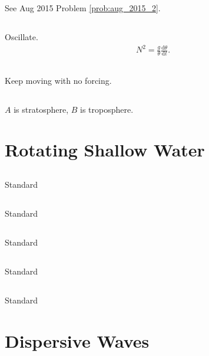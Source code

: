 \documentclass[11pt,letterpaper]{book}
\theoremstyle{definition}
\newcommand{\de}{\mathrm{d}}
\begin{document}
\subsection{}
See Aug 2015 Problem \ref{prob:aug_2015_2}.

\subsection{}
Oscillate. 
\begin{align*}
    N^2 = \frac{g}{\theta}\frac{\de \theta}{\de t}.
\end{align*}

\subsection{}
Keep moving with no forcing.

\subsection{}
$A$ is stratosphere, $B$ is troposphere.

\section{Rotating Shallow Water}
\subsection{}
Standard

\subsection{}
Standard

\subsection{}
Standard

\subsection{}
Standard

\subsection{}
Standard

\section{Dispersive Waves}
\end{document}
